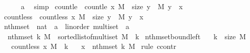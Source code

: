 \begin{isabellebody}
\ \ \ \ \isamarkupfalse%
\ a\ \isamarkupfalse%
\ simp\isanewline
{}\isamarkupfalse%
%
\endisatagproof
{\isafoldproof}%
%
\isadelimproof
\isanewline
%
\endisadelimproof
\isanewline
{}\isamarkupfalse%
\ count{\isacharunderscore}{\kern0pt}le\ \ {\isachardoublequoteopen}count{\isacharunderscore}{\kern0pt}le\ x\ M\ {\isacharequal}{\kern0pt}\ size\ {\isacharbraceleft}{\kern0pt}{\isacharhash}{\kern0pt}y\ {\isasymin}{\isacharhash}{\kern0pt}\ M{\isachardot}{\kern0pt}\ y\ {\isasymle}\ x{\isacharhash}{\kern0pt}{\isacharbraceright}{\kern0pt}{\isachardoublequoteclose}\isanewline
{}\isamarkupfalse%
\ count{\isacharunderscore}{\kern0pt}less\ \ {\isachardoublequoteopen}count{\isacharunderscore}{\kern0pt}less\ x\ M\ {\isacharequal}{\kern0pt}\ size\ {\isacharbraceleft}{\kern0pt}{\isacharhash}{\kern0pt}y\ {\isasymin}{\isacharhash}{\kern0pt}\ M{\isachardot}{\kern0pt}\ y\ {\isacharless}{\kern0pt}\ x{\isacharhash}{\kern0pt}{\isacharbraceright}{\kern0pt}{\isachardoublequoteclose}\isanewline
\isanewline
{}\isamarkupfalse%
\ nth{\isacharunderscore}{\kern0pt}mset\ {\isacharcolon}{\kern0pt}{\isacharcolon}{\kern0pt}\ {\isachardoublequoteopen}nat\ {\isasymRightarrow}\ {\isacharparenleft}{\kern0pt}{\isacharprime}{\kern0pt}a\ {\isacharcolon}{\kern0pt}{\isacharcolon}{\kern0pt}\ linorder{\isacharparenright}{\kern0pt}\ multiset\ {\isasymRightarrow}\ {\isacharprime}{\kern0pt}a{\isachardoublequoteclose}\ \isanewline
\ \ {\isachardoublequoteopen}nth{\isacharunderscore}{\kern0pt}mset\ k\ M\ {\isacharequal}{\kern0pt}\ sorted{\isacharunderscore}{\kern0pt}list{\isacharunderscore}{\kern0pt}of{\isacharunderscore}{\kern0pt}multiset\ M\ {\isacharbang}{\kern0pt}\ k{\isachardoublequoteclose}\isanewline
\isanewline
{}\isamarkupfalse%
\ nth{\isacharunderscore}{\kern0pt}mset{\isacharunderscore}{\kern0pt}bound{\isacharunderscore}{\kern0pt}left{\isacharcolon}{\kern0pt}\isanewline
\ \ \ {\isachardoublequoteopen}k\ {\isacharless}{\kern0pt}\ size\ M{\isachardoublequoteclose}\isanewline
\ \ \ {\isachardoublequoteopen}count{\isacharunderscore}{\kern0pt}less\ x\ M\ {\isasymle}\ k{\isachardoublequoteclose}\isanewline
\ \ \ {\isachardoublequoteopen}x\ {\isasymle}\ nth{\isacharunderscore}{\kern0pt}mset\ k\ M{\isachardoublequoteclose}\isanewline
%
\isadelimproof
%
\endisadelimproof
%
\isatagproof
{}\isamarkupfalse%
\ {\isacharparenleft}{\kern0pt}rule\ ccontr{\isacharparenright}{\kern0pt}\isanewline

\end{isabellebody}
